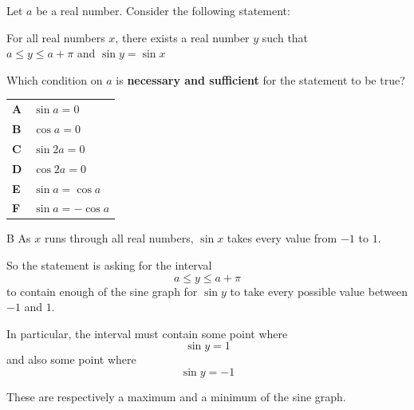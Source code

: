 \documentclass[11pt,a4paper]{article}
\begin{document}
\begin{enumerate}[label=\textbf{\arabic*.},leftmargin=*,itemsep=0pt,start=17]
\questionitem[Logic]
Let $a$ be a real number. Consider the following statement:

\begin{center}
\begin{minipage}{0.8\textwidth}
\centering
For all real numbers $x$, there exists a real number $y$ such that\\

$a\le y\le a+\pi$ and $\sin y=\sin x$
\end{minipage}
\end{center}

Which condition on $a$ is \textbf{necessary and sufficient} for the statement to be true?

\par\vspace*{12pt}
\begin{tabularx}{\linewidth}{@{}>{\bfseries}l Y@{}}
A &
$\sin a=0$
\\[0.8em]
B &
$\cos a=0$
\\[0.8em]
C &
$\sin 2a=0$
\\[0.8em]
D &
$\cos 2a=0$
\\[0.8em]
E &
$\sin a=\cos a$
\\[0.8em]
F &
$\sin a=-\cos a$
\\
\end{tabularx}

\begin{djsSolution}{B}
As \(x\) runs through all real numbers, \(\sin x\) takes every value from \(-1\) to \(1\).

So the statement is asking for the interval
\[
a\leq y\leq a+\pi
\]
to contain enough of the sine graph for \(\sin y\) to take every possible value between \(-1\) and \(1\).

In particular, the interval must contain some point where
\[
\sin y=1
\]
and also some point where
\[
\sin y=-1
\]

These are respectively a maximum and a minimum of the sine graph.

\begin{djsSolutionFigure}
\end{djsSolutionFigure}
\end{djsSolution}
\end{enumerate}
\end{document}
